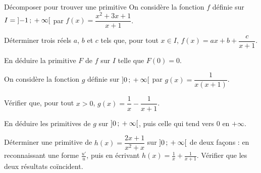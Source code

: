 \begin{exercice}[3]{Décomposer pour trouver une primitive}
On considère la fonction $f$ définie sur $I=\mathopen{]}-1\,{;}\,+\infty\mathclose{[}$ par $f(x)=\dfrac{x^{2}+3x+1}{x+1}$.
\begin{questions}
  \item Déterminer trois réels $a$, $b$ et $c$ tels que, pour tout $x\in I$, $f(x)=ax+b+\dfrac{c}{x+1}$.
  \item En déduire la primitive $F$ de $f$ sur $I$ telle que $F(0)=0$.
\end{questions}
On considère la fonction $g$ définie sur $\mathopen{]}0\,{;}\,+\infty\mathclose{[}$ par $g(x)=\dfrac{1}{x(x+1)}$.
\begin{questions}[resume]
  \item Vérifier que, pour tout $x>0$, $g(x)=\dfrac1x-\dfrac{1}{x+1}$.
  \item En déduire les primitives de $g$ sur $\mathopen{]}0\,{;}\,+\infty\mathclose{[}$, puis celle qui tend vers $0$ en $+\infty$.
  \item Déterminer une primitive de $h(x)=\dfrac{2x+1}{x^{2}+x}$ sur $\mathopen{]}0\,{;}\,+\infty\mathclose{[}$ de deux façons : en reconnaissant une forme
    $\frac{u'}{u}$, puis en écrivant $h(x)=\frac1x+\frac{1}{x+1}$. Vérifier que les deux résultats coïncident.
\end{questions}
\end{exercice}

